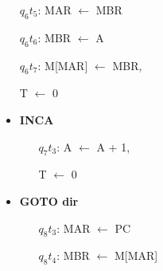\documentclass{article}
\begin{document}
\begin{table}[!htbp]
{\begin{minipage}{\textwidth}
\begin{multicols}{2}
\begin{itemize}
\begin{enumerate}[itemsep=-1ex]
                                PC $\leftarrow$ PC + 1
                            
                            \item[$q_6t_5$:]
                                MAR $\leftarrow$ MBR
                   
                            \item[$q_6t_6$:] 
                                MBR $\leftarrow$ A
                            
                            \item[$q_6t_7$:] 
                                M[MAR] $\leftarrow$ MBR,
                                
                                T $\leftarrow$ 0
                        
                        \end{enumerate}
                \end{itemize}
                
            
            
                \begin{itemize}
                    \item \textbf{INCA}
                        \begin{enumerate}[itemsep=-1ex] 
                            \item[$q_7 t_3$:]  
                                A $\leftarrow$ A + 1,
                                
                                T $\leftarrow$ 0
                                
                        
                        \end{enumerate}
                \end{itemize}
                
                
                
                \begin{itemize}
                    \item \textbf{GOTO dir}
                        \begin{enumerate}[itemsep=-1ex] 
                            \item[$q_8t_3$:] 
                                MAR $\leftarrow$ PC
                            
                            \item[$q_8t_4$:]
                                MBR $\leftarrow$ M[MAR]
                                

\end{enumerate}
\end{itemize}
\end{multicols}
\end{minipage}}
\end{table}
\end{document}
